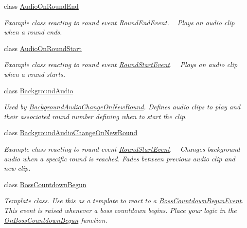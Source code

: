 \begin{DoxyCompactItemize}
\item 
class \hyperlink{class_round_manager_1_1_audio_on_round_end}{Audio\+On\+Round\+End}
\begin{DoxyCompactList}\small\item\em Example class reacting to round event \hyperlink{class_round_manager_1_1_events_1_1_round_end_event}{Round\+End\+Event}. ~\newline
Plays an audio clip when a round ends. \end{DoxyCompactList}\item 
class \hyperlink{class_round_manager_1_1_audio_on_round_start}{Audio\+On\+Round\+Start}
\begin{DoxyCompactList}\small\item\em Example class reacting to round event \hyperlink{class_round_manager_1_1_events_1_1_round_start_event}{Round\+Start\+Event}. ~\newline
Plays an audio clip when a round starts. \end{DoxyCompactList}\item 
class \hyperlink{class_round_manager_1_1_background_audio}{Background\+Audio}
\begin{DoxyCompactList}\small\item\em Used by \hyperlink{class_round_manager_1_1_background_audio_change_on_new_round}{Background\+Audio\+Change\+On\+New\+Round}. Defines audio clips to play and their associated round number defining when to start the clip. \end{DoxyCompactList}\item 
class \hyperlink{class_round_manager_1_1_background_audio_change_on_new_round}{Background\+Audio\+Change\+On\+New\+Round}
\begin{DoxyCompactList}\small\item\em Example class reacting to round event \hyperlink{class_round_manager_1_1_events_1_1_round_start_event}{Round\+Start\+Event}. ~\newline
Changes background audio when a specific round is reached. Fades between previous audio clip and new clip. \end{DoxyCompactList}\item 
class \hyperlink{class_round_manager_1_1_boss_countdown_begun}{Boss\+Countdown\+Begun}
\begin{DoxyCompactList}\small\item\em Template class. Use this as a template to react to a \hyperlink{class_round_manager_1_1_events_1_1_boss_countdown_begun_event}{Boss\+Countdown\+Begun\+Event}. This event is raised whenever a boss countdown begins. Place your logic in the \hyperlink{class_round_manager_1_1_boss_countdown_begun_a2078435316b5acaaaf56e1be92666626}{On\+Boss\+Countdown\+Begun} function. \end{DoxyCompactList}\item 

\end{DoxyCompactItemize}
